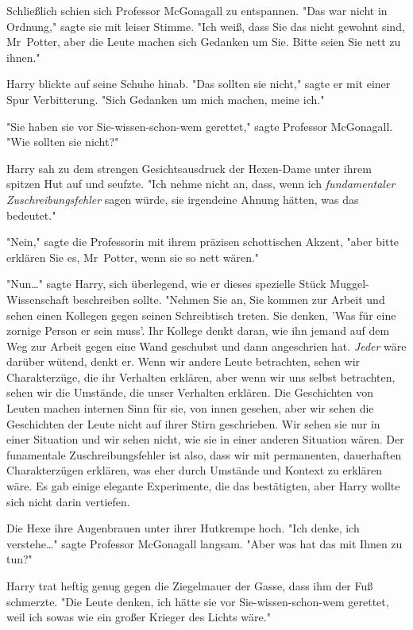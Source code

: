 {Schließlich schien sich Professor McGonagall zu entspannen. "Das war nicht in Ordnung," sagte sie mit leiser Stimme. "Ich weiß, dass Sie das nicht gewohnt sind, Mr~Potter, aber die Leute machen sich Gedanken um Sie. Bitte seien Sie nett zu ihnen."

Harry blickte auf seine Schuhe hinab. "Das sollten sie nicht," sagte er mit einer Spur Verbitterung. "Sich Gedanken um mich machen, meine ich."

"Sie haben sie vor Sie-wissen-schon-wem gerettet," sagte Professor McGonagall. "Wie sollten sie nicht?"

Harry sah zu dem strengen Gesichtsausdruck der Hexen-Dame unter ihrem spitzen Hut auf und seufzte. "Ich nehme nicht an, dass, wenn ich \emph{fundamentaler Zuschreibungsfehler} sagen würde, sie irgendeine Ahnung hätten, was das bedeutet."

"Nein," sagte die Professorin mit ihrem präzisen schottischen Akzent, "aber bitte erklären Sie es, Mr~Potter, wenn sie so nett wären."

"Nun…" sagte Harry, sich überlegend, wie er dieses spezielle Stück Muggel-Wissenschaft beschreiben sollte. "Nehmen Sie an, Sie kommen zur Arbeit und sehen einen Kollegen gegen seinen Schreibtisch treten. Sie denken, 'Was für eine zornige Person er sein muss'. Ihr Kollege denkt daran, wie ihn jemand auf dem Weg zur Arbeit gegen eine Wand geschubst und dann angeschrien hat. \emph{Jeder} wäre darüber wütend, denkt er. Wenn wir andere Leute betrachten, sehen wir Charakterzüge, die ihr Verhalten erklären, aber wenn wir uns selbst betrachten, sehen wir die Umstände, die unser Verhalten erklären. Die Geschichten von Leuten machen internen Sinn für sie, von innen gesehen, aber wir sehen die Geschichten der Leute nicht auf ihrer Stirn geschrieben. Wir sehen sie nur in einer Situation und wir sehen nicht, wie sie in einer anderen Situation wären. Der funamentale Zuschreibungsfehler ist also, dass wir mit permanenten, dauerhaften Charakterzügen erklären, was eher durch Umstände und Kontext zu erklären wäre. Es gab einige elegante Experimente, die das bestätigten, aber Harry wollte sich nicht darin vertiefen.

Die Hexe ihre Augenbrauen unter ihrer Hutkrempe hoch. "Ich denke, ich verstehe…" sagte Professor McGonagall langsam. "Aber was hat das mit Ihnen zu tun?"

Harry trat heftig genug gegen die Ziegelmauer der Gasse, dass ihm der Fuß schmerzte. "Die Leute denken, ich hätte sie vor Sie-wissen-schon-wem gerettet, weil ich sowas wie ein großer Krieger des Lichts wäre."

}
